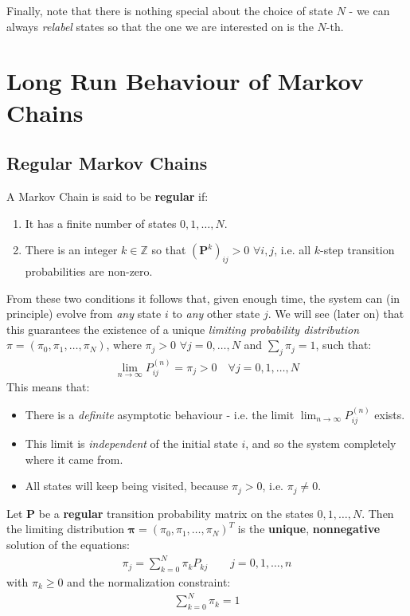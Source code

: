 \documentclass[../template.tex]{subfiles}
\begin{document}
Finally, note that there is nothing special about the choice of state $N$ - we can always \textit{relabel} states so that the one we are interested on is the $N$-th. 

\chapter{Long Run Behaviour of Markov Chains}
\section{Regular Markov Chains}
A Markov Chain is said to be \textbf{regular} if:
\begin{enumerate}
    \item It has a finite number of states $0,1,\dots, N$.
    \item There is an integer $k \in \mathbb{Z}$ so that $(\textbf{P}^k)_{ij} > 0$ $\forall i, j$, i.e. all $k$-step transition probabilities are non-zero.  
\end{enumerate}
From these two conditions it follows that, given enough time, the system can (in principle) evolve from \textit{any} state $i$ to \textit{any} other state $j$. We will see (later on) that this guarantees the existence of a unique \textit{limiting probability distribution} $\pi = (\pi_0, \pi_1, \dots, \pi_N)$, where $\pi_j >0$ $\forall j =0,\dots, N$ and $\sum_j \pi_j = 1$, such that:
\begin{align*}
    \lim_{n \to \infty} P_{ij}^{(n)} = \pi_j > 0 \quad \forall j = 0,1,\dots,N
\end{align*} 
This means that:
\begin{itemize}
    \item There is a \textit{definite} asymptotic behaviour - i.e. the limit $\lim_{n \to \infty} P_{ij}^{(n)}$ exists. 
    \item This limit is \textit{independent} of the initial state $i$, and so the system completely  where it came from.
    \item All states will keep being visited, because $\pi_j > 0$, i.e. $\pi_j \neq 0$. 
\end{itemize}

\begin{thm}
    Let \textbf{P} be a \textbf{regular} transition probability matrix on the states $0,1,\dots, N$. Then the limiting distribution $\bm{\pi} = (\pi_0, \pi_1, \dots, \pi_N)^{T}$ is the \textbf{unique}, \textbf{nonnegative} solution of the equations:
    \begin{align} \label{eqn:limit-p}
        \pi_j = \sum_{k=0}^N \pi_k P_{kj} \qquad j=0,1,\dots,n
    \end{align}   
    with $\pi_k \geq 0$ and the normalization constraint:
    \begin{align} \label{eqn:limit-norm}
        \sum_{k=0}^N \pi_k = 1
    \end{align}
\end{thm}
\end{document}
